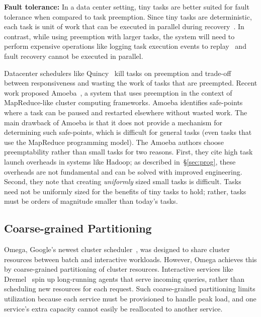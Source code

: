 

\vspace{4pt}\noindent\textbf{Fault tolerance:}
In a data center setting, tiny tasks are better suited for
fault tolerance when compared to task preemption. Since tiny tasks
are deterministic, each task is unit of work that can be executed in parallel
 during recovery~\cite{zaharia2012discretized}. In contrast, while using 
preemption with larger tasks, the system will need to perform expensive
operations like logging task execution events to replay~\cite{dunlap2002revirt}
and fault recovery cannot be executed in parallel.

Datacenter schedulers like Quincy~\cite{isard2009quincy} kill tasks on
preemption and trade-off between responsiveness and wasting the work of tasks
that are preempted.  Recent work proposed Amoeba~\cite{ananthanarayanan2012true},
a system that uses preemption in the context of MapReduce-like
cluster computing frameworks. Amoeba identifies safe-points where a task can be
paused and restarted elsewhere without wasted work. The main drawback of Amoeba
is that it does not provide a mechanism for determining such safe-points, which
is difficult for general tasks (even tasks that use the MapReduce programming
model).  The Amoeba authors choose preemptability rather than small tasks for
two reasons. First, they cite high task launch overheads in systems like
Hadoop; as described in~\S\ref{sec:prog}, these overheads are not fundamental
and can be solved with improved engineering. Second, they note that creating
\emph{uniformly} sized small tasks is difficult. Tasks need not be uniformly
sized for the benefits of tiny tasks to hold; rather, tasks must be orders of
magnitude smaller than today's tasks.

\subsection{Coarse-grained Partitioning}
Omega, Google's newest cluster scheduler~\cite{melnik2010dremel},
was designed to share cluster
resources between batch and interactive workloads. However, Omega achieves
this by coarse-grained partitioning of cluster resources.
Interactive services like Dremel~\cite{melnik2010dremel} spin up long-running
agents that serve incoming queries, rather than scheduling new resources for
each request.  Such coarse-grained partitioning limits utilization because each service
must be provisioned to handle peak load, and one service's extra capacity
cannot easily be reallocated to another service.

